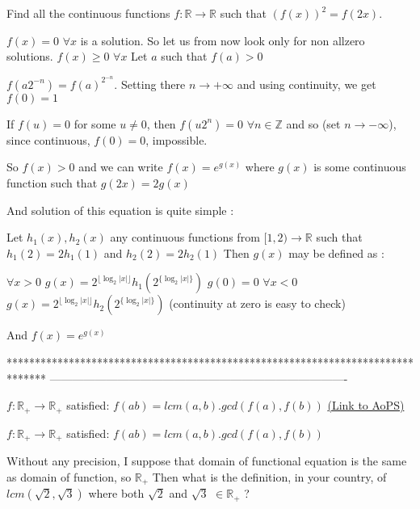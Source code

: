 \begin{solution}
	\begin{tcolorbox}Find all the continuous functions $f: \mathbb{R}\to\mathbb{R}$ such that $(f(x))^2=f(2x)$.\end{tcolorbox}
$f(x)=0$ $\forall x$ is a solution. So let us from now look only for non allzero solutions.
$f(x)\ge 0$ $\forall x$
Let $a$ such that $f(a)>0$

$f(a2^{-n})=f(a)^{2^{-n}}$. Setting there $n\to +\infty$ and using continuity, we get $f(0)=1$

If $f(u)=0$ for some $u\ne 0$, then $f(u2^{n})=0$ $\forall n\in\mathbb Z$ and so (set $n\to-\infty$), since continuous, $f(0)=0$, impossible.

So $f(x)>0$ and we can write $f(x)=e^{g(x)}$ where $g(x)$ is some continuous function such that $g(2x)=2g(x)$

And solution of this equation is quite simple :

Let $h_1(x),h_2(x)$ any continuous functions from $[1,2)\to\mathbb R$ such that $h_1(2)=2h_1(1)$ and $h_2(2)=2h_2(1)$
Then $g(x)$ may be defined as :

$\forall x>0$ $g(x)=2^{\lfloor\log_2 |x|\rfloor}h_1(2^{\{\log_2|x|\}})$
$g(0)=0$
$\forall x<0$ $g(x)=2^{\lfloor\log_2 |x|\rfloor}h_2(2^{\{\log_2 |x|\}})$
(continuity at zero is easy to check)

And $f(x)=e^{g(x)}$
\end{solution}
*******************************************************************************
-------------------------------------------------------------------------------

\begin{problem}
	$f: \mathbb{R_+} \rightarrow \mathbb{R_+}$ satisfied:
$f(ab) = lcm(a,b) . gcd(f(a), f(b))$
	\flushright \href{https://artofproblemsolving.com/community/c6h565363}{(Link to AoPS)}
\end{problem}



\begin{solution}
	\begin{tcolorbox}$f: \mathbb{R_+} \rightarrow \mathbb{R_+}$ satisfied:
$f(ab) = lcm(a,b) . gcd(f(a), f(b))$\end{tcolorbox}
Without any precision, I suppose that domain of functional equation is the same as domain of function, so $\mathbb R_+$
Then what is the definition,  in your country, of $lcm(\sqrt 2,\sqrt3)$ where both $\sqrt2$ and $\sqrt 3$ $\in\mathbb R_+$ ?
\end{solution}



